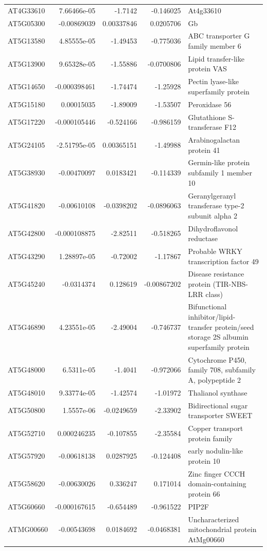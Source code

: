 \documentclass[11pt]{article}
\begin{document}
\begin{center}
\begin{tabular}{lrrrl}
AT4G33610 & 7.66466e-05 & -1.7142 & -0.146025 & At4g33610\\
AT5G05300 & -0.00869039 & 0.00337846 & 0.0205706 & Gb\\
AT5G13580 & 4.85555e-05 & -1.49453 & -0.775036 & ABC transporter G family member 6\\
AT5G13900 & 9.65328e-05 & -1.55886 & -0.0700806 & Lipid transfer-like protein VAS\\
AT5G14650 & -0.000398461 & -1.74474 & -1.25928 & Pectin lyase-like superfamily protein\\
AT5G15180 & 0.00015035 & -1.89009 & -1.53507 & Peroxidase 56\\
AT5G17220 & -0.000105446 & -0.524166 & -0.986159 & Glutathione S-transferase F12\\
AT5G24105 & -2.51795e-05 & 0.00365151 & -1.49988 & Arabinogalactan protein 41\\
AT5G38930 & -0.00470097 & 0.0183421 & -0.114339 & Germin-like protein subfamily 1 member 10\\
AT5G41820 & -0.00610108 & -0.0398202 & -0.0896063 & Geranylgeranyl transferase type-2 subunit alpha 2\\
AT5G42800 & -0.000108875 & -2.82511 & -0.518265 & Dihydroflavonol reductase\\
AT5G43290 & 1.28897e-05 & -0.72002 & -1.17867 & Probable WRKY transcription factor 49\\
AT5G45240 & -0.0314374 & 0.128619 & -0.00867202 & Disease resistance protein (TIR-NBS-LRR class)\\
AT5G46890 & 4.23551e-05 & -2.49004 & -0.746737 & Bifunctional inhibitor/lipid-transfer protein/seed storage 2S albumin superfamily protein\\
AT5G48000 & 6.5311e-05 & -1.4041 & -0.972066 & Cytochrome P450, family 708, subfamily A, polypeptide 2\\
AT5G48010 & 9.33774e-05 & -1.42574 & -1.01972 & Thalianol synthase\\
AT5G50800 & 1.5557e-06 & -0.0249659 & -2.33902 & Bidirectional sugar transporter SWEET\\
AT5G52710 & 0.000246235 & -0.107855 & -2.35584 & Copper transport protein family\\
AT5G57920 & -0.00618138 & 0.0287925 & -0.124408 & early nodulin-like protein 10\\
AT5G58620 & -0.00630026 & 0.336247 & 0.171014 & Zinc finger CCCH domain-containing protein 66\\
AT5G60660 & -0.000167615 & -0.654489 & -0.961522 & PIP2F\\
ATMG00660 & -0.00543698 & 0.0184692 & -0.0468381 & Uncharacterized mitochondrial protein AtMg00660\\
\end{tabular}
\end{center}
\end{document}
